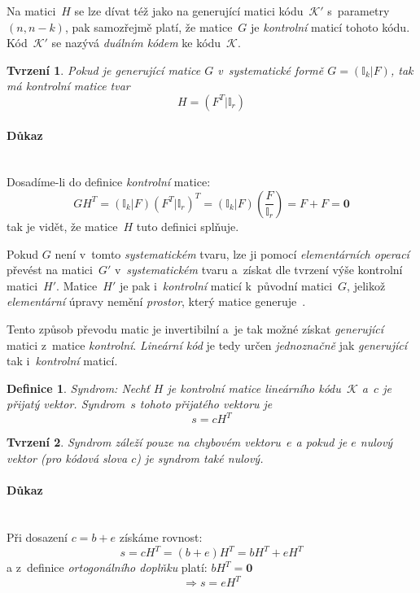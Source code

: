 \documentclass[thesis=M,czech,hidelinks]{FITthesis}[2012/06/26]
\newcommand{\0}{{\textcolor[gray]{0.75}{0}}}
\newtheorem{tvrzeni}{Tvrzení}
\newtheorem{definice}{Definice}
\begin{document}
Na matici~$H$ se lze dívat též jako na generující matici kódu~$\mathcal{K}'$
s~parametry~$(n,n-k)$, pak samozřejmě platí, že matice~$G$ je \emph{kontrolní}
maticí tohoto kódu. Kód~$\mathcal{K}'$ se nazývá \emph{duálním kódem} ke
kódu~$\mathcal{K}$.

\begin{tvrzeni}
    Pokud je \emph{generující} matice $G$ v~systematické formě
    $G=(\mathbb{I}_k|F)$, tak má \emph{kontrolní} matice tvar
    $$ H=(F^T|\mathbb{I}_r) $$
\end{tvrzeni}

\paragraph{Důkaz} \hfil \\
Dosadíme-li do definice \emph{kontrolní} matice:
$$
    G H^T = (\mathbb{I}_k|F)(F^T|\mathbb{I}_r)^T =
    (\mathbb{I}_k|F)(\frac{F}{\mathbb{I}_r}) = F + F = \textbf{0}
$$
tak je vidět, že matice~$H$ tuto definici splňuje.

Pokud $G$ není v~tomto \emph{systematickém} tvaru, lze ji pomocí
\emph{elementárních operací} převést na matici~$G'$ v~\emph{systematickém} tvaru
a~získat dle tvrzení výše kontrolní matici~$H'$. Matice~$H'$ je pak
i~\emph{kontrolní} maticí k~původní matici~$G$, jelikož \emph{elementární}
úpravy nemění \emph{prostor}, který matice generuje~\cite{Adamek}.

Tento způsob převodu matic je invertibilní a~je tak možné získat
\emph{generující} matici z~matice \emph{kontrolní}. \emph{Lineární kód} je tedy
určen \emph{jednoznačně} jak \emph{generující} tak i~\emph{kontrolní} maticí.

\begin{definice}{Syndrom:}
    Nechť $H$ je \emph{kontrolní} matice \emph{lineárního} kódu~$\mathcal{K}$
    a~$c$ je přijatý vektor. \emph{Syndrom}~$s$ tohoto přijatého vektoru je
    $$ s = c H^T $$
\end{definice}

\begin{tvrzeni}
    \emph{Syndrom} záleží pouze na chybovém vektoru~$e$ a pokud je $e$ nulový
    vektor (pro kódová slova $c$) je syndrom také \emph{nulový}.
\end{tvrzeni}

\paragraph{Důkaz} \hfil \\
Při dosazení $c=b+e$ získáme rovnost:
$$ s = c H^T = (b+e)H^T = b H^T + e H^T $$
a z~definice \emph{ortogonálního doplňku} platí: $ b H^T = \textbf{0} $
$$ \Rightarrow s = e H^T $$
\end{document}
